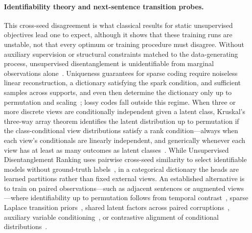 \paragraph{Identifiability theory and next-sentence transition probes.}
This cross-seed disagreement is what classical results for static
unsupervised objectives lead one to expect, although it shows that these
training runs are unstable, not that every optimum or training procedure
must disagree. Without auxiliary supervision or structural
constraints matched to the data-generating process, unsupervised
disentanglement is unidentifiable from marginal observations
alone~\cite{locatello2019}. Uniqueness guarantees for sparse coding
require noiseless linear reconstruction, a dictionary satisfying the
spark condition, and sufficient samples across supports, and even then
determine the dictionary only up to permutation and
scaling~\cite{hillar2015}; lossy codes fall outside this regime. When
three or more discrete views are conditionally independent given a latent
class, Kruskal's three-way array theorem identifies the latent
distribution up to permutation if the class-conditional view
distributions satisfy a rank condition---always when each view's
conditionals are linearly independent, and generically whenever each view
has at least as many outcomes as latent classes~\cite{allman2009}. While
Unsupervised Disentanglement Ranking uses pairwise cross-seed similarity
to select identifiable models without ground-truth labels~\cite{udr2020},
in a categorical dictionary the heads are learned partitions rather than
fixed
external views. An established alternative is to train on paired
observations---such as adjacent sentences or augmented views---where
identifiability up to permutation follows from temporal
contrast~\cite{pcl2017}, sparse Laplace transition priors~\cite{slowvae2021},
shared latent factors across paired corruptions~\cite{locatello2020},
auxiliary variable conditioning~\cite{ivae2020}, or contrastive alignment
of conditional distributions~\cite{zimmermann2021}.


